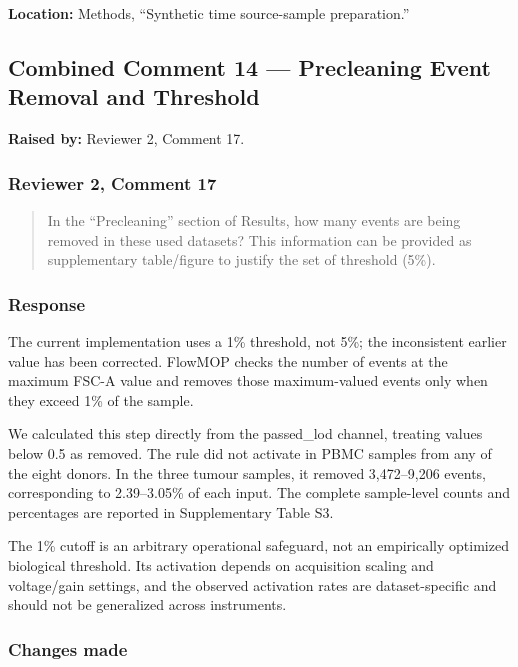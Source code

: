 \documentclass[
  11pt,
  a4paper,
]{article}
\begin{document}
\textbf{Location:} Methods, ``Synthetic time source-sample
preparation.''

\subsection{Combined Comment 14 --- Precleaning Event Removal and
Threshold}\label{combined-comment-14--precleaning-event-removal-and-threshold}

\textbf{Raised by:} Reviewer 2, Comment 17.

\subsubsection{Reviewer 2, Comment 17}\label{reviewer-2-comment-17}

\begin{quote}
In the ``Precleaning'' section of Results, how many events are being
removed in these used datasets? This information can be provided as
supplementary table/figure to justify the set of threshold (5\%).
\end{quote}

\subsubsection{Response}\label{response-13}

The current implementation uses a 1\% threshold, not 5\%; the
inconsistent earlier value has been corrected. FlowMOP checks the number
of events at the maximum FSC-A value and removes those maximum-valued
events only when they exceed 1\% of the sample.

We calculated this step directly from the passed\_lod channel, treating
values below 0.5 as removed. The rule did not activate in PBMC samples
from any of the eight donors. In the three tumour samples, it removed
3,472--9,206 events, corresponding to 2.39--3.05\% of each input. The
complete sample-level counts and percentages are reported in
Supplementary Table S3.

The 1\% cutoff is an arbitrary operational safeguard, not an empirically
optimized biological threshold. Its activation depends on acquisition
scaling and voltage/gain settings, and the observed activation rates are
dataset-specific and should not be generalized across instruments.

\subsubsection{Changes made}\label{changes-made-13}
\end{document}
